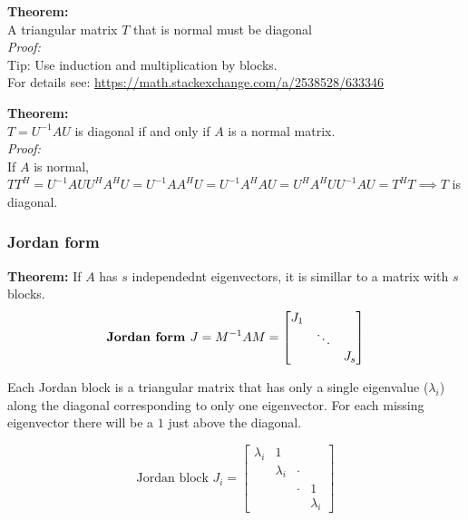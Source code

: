\vspace{6pt}

\textbf{Theorem:}\\
A triangular matrix $T$ that is normal must be diagonal\\
\textit{Proof:}\\
Tip: Use induction and multiplication by blocks.\\
For details see: \url{https://math.stackexchange.com/a/2538528/633346}



\vspace{6pt}

\textbf{Theorem:}\\
$T = U^{-1}AU$ is diagonal if and only if $A$ is a normal matrix.\\
\textit{Proof:}\\
If $A$ is normal, \\
$TT^H = U^{-1}AUU^HA^HU = U^{-1}AA^HU = U^{-1}A^HAU = U^HA^HUU^{-1}AU = T^HT \implies T$ is diagonal.

\subsubsection{Jordan form}

\textbf{Theorem:} If $A$ has $s$ independednt eigenvectors, it is simillar to a matrix with $s$ blocks.\\
$$
\text{\textbf{Jordan form }}
J = M^{-1}AM =
\begin{bmatrix}
J_1 & & \\
& \ddots & \\
& & J_s\\
\end{bmatrix}
$$

Each Jordan block is a triangular matrix that has only a single eigenvalue ($\lambda_i$) along the diagonal corresponding to only one eigenvector. For each missing eigenvector there will be a $1$ just above the diagonal.


$$
\text{Jordan block }
J_i = 
\begin{bmatrix}
\lambda_i & 1 & & \\
& \lambda_i &  \cdot & \\
& & \cdot & 1\\
& & & \lambda_i
\end{bmatrix}
$$
